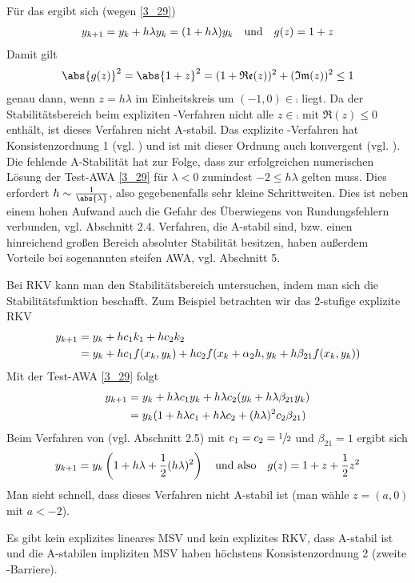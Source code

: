 Für das  ergibt sich (wegen \cref{3_29})
\begin{align}
	y_{k+1} = y_k + h\lambda y_k = (1+h\lambda)y_k\quad\text{und}\quad g(z) = 1+z\notag
\end{align}
Damit gilt
\begin{align}
	\abs{g(z)}^2 = \abs{1+z}^2 = (1+\Re(z))^2 + (\Im(z))^2 \le 1 \notag
\end{align}
genau dann, wenn $z=h\lambda$ im Einheitskreis um $(-1,0)\in\comp$ liegt. Da der Stabilitätsbereich beim expliziten -Verfahren nicht alle $z\in\comp$ mit $\Re(z)\le 0$ enthält, ist dieses Verfahren nicht A-stabil. Das explizite -Verfahren hat Konsistenzordnung 1 (vgl. ) und ist mit dieser Ordnung auch konvergent (vgl. ). Die fehlende A-Stabilität hat zur Folge, dass zur erfolgreichen numerischen Lösung der Test-AWA \cref{3_29} für $\lambda <0$ zumindest $-2\le h\lambda$ gelten muss. Dies erfordert $h\sim \frac{1}{\abs{\lambda}}$, also gegebenenfalls sehr kleine Schrittweiten. Dies ist neben einem hohen Aufwand auch die Gefahr des Überwiegens von Rundungsfehlern verbunden, vgl. Abschnitt 2.4. Verfahren, die A-stabil sind, bzw. einen hinreichend großen Bereich absoluter Stabilität besitzen, haben außerdem Vorteile bei sogenannten steifen AWA, vgl. Abschnitt 5.

Bei RKV kann man den Stabilitätsbereich untersuchen, indem man sich die Stabilitätsfunktion beschafft. Zum Beispiel betrachten wir das 2-stufige explizite RKV
\begin{align}
	y_{k+1} &= y_k + hc_1k_1 + hc_2k_2 \notag \\
	&= y_k + hc_1f(x_k,y_k) + hc_2f(x_k+\alpha_2h,y_k + h\beta_{21}f(x_k,y_k))\notag
\end{align}
Mit der Test-AWA \cref{3_29} folgt
\begin{align}
	y_{k+1} &= y_k + h\lambda c_1y_k + h\lambda c_2(y_k + h\lambda\beta_{21} y_k) \notag \\
	&= y_k(1+h\lambda c_1 + h\lambda c_2 + (h\lambda)^2 c_2\beta_{21}) \notag
\end{align}
Beim Verfahren von  (vgl. Abschnitt 2.5) mit $c_1=c_2=\sfrac{1}{2}$ und $\beta_{21}=1$ ergibt sich
\begin{align}
	y_{k+1} = y_k\left(1+h\lambda + \frac{1}{2}(h\lambda)^2\right)\quad\text{und also}\quad g(z) = 1+z+\frac{1}{2}z^2 \notag
\end{align}
Man sieht schnell, dass dieses Verfahren nicht A-stabil ist (man wähle $z=(a,0)$ mit $a<-2$).

\begin{remark}
	Es gibt kein explizites lineares MSV und kein explizites RKV, dass A-stabil ist und die A-stabilen impliziten MSV haben höchstens Konsistenzordnung 2 (zweite -Barriere).
\end{remark}